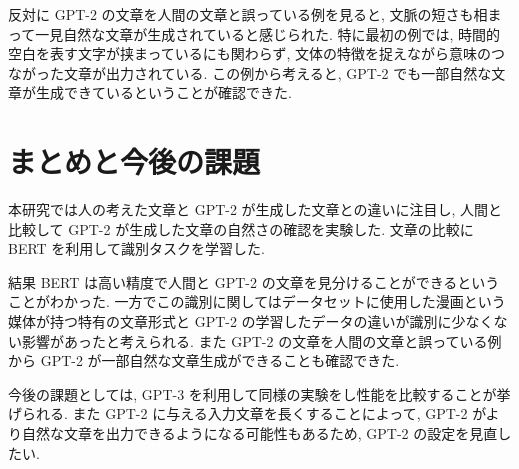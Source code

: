 \documentclass[twocolumn]{jarticle}     %
\begin{document}
反対に GPT-2 の文章を人間の文章と誤っている例を見ると,
文脈の短さも相まって一見自然な文章が生成されていると感じられた.
特に最初の例では, 時間的空白を表す文字が挟まっているにも関わらず, 文体の特徴を捉えながら意味のつながった文章が出力されている.
この例から考えると, GPT-2 でも一部自然な文章が生成できているということが確認できた.

\section{まとめと今後の課題}

本研究では人の考えた文章と GPT-2 が生成した文章との違いに注目し,
人間と比較して GPT-2 が生成した文章の自然さの確認を実験した.
文章の比較に BERT を利用して識別タスクを学習した.

結果 BERT は高い精度で人間と GPT-2 の文章を見分けることができるということがわかった.
一方でこの識別に関してはデータセットに使用した漫画という媒体が持つ特有の文章形式と GPT-2 の学習したデータの違いが識別に少なくない影響があったと考えられる.
また GPT-2 の文章を人間の文章と誤っている例から GPT-2 が一部自然な文章生成ができることも確認できた.


今後の課題としては, GPT-3 を利用して同様の実験をし性能を比較することが挙げられる.
また GPT-2 に与える入力文章を長くすることによって, GPT-2 がより自然な文章を出力できるようになる可能性もあるため, GPT-2 の設定を見直したい.



\end{document}
